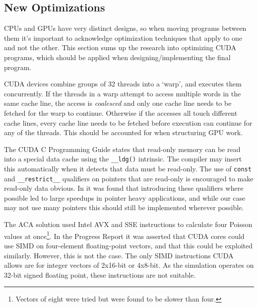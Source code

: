 \subsection{New Optimizations}
\label{sec:FutureOptimization}
CPUs and GPUs have very distinct designs, so when moving programs between them it's important to acknowledge optimization techniques that apply to one and not the other.
This section sums up the research into optimizing CUDA programs, which should be applied when designing/implementing the final program.

CUDA devices combine groups of 32 threads into a `warp', and executes them concurrently\cite{tool:CUDAProgrammingV1}.
If the threads in a warp attempt to access multiple words in the same cache line, the access is \textit{coalesced}\cite{NVIDIAHowBlog} and only one cache line needs to be fetched for the warp to continue.
Otherwise if the accesses all touch different cache lines, every cache line needs to be fetched before execution can continue for any of the threads.
This should be accounted for when structuring GPU work.

The CUDA C Programming Guide\cite{NVIDIAGlobalGuide} states that read-only memory can be read into a special data cache using the \texttt{\_\_ldg()} intrinsic.
The compiler may insert this automatically when it detects that data must be read-only.
The use of \texttt{const} and \texttt{\_\_restrict\_\_} qualifiers on pointers that are read-only is encouraged to make read-only data obvious.
In \cite{10.1145/3238147.3241533} it was found that introducing these qualifiers where possible led to large speedups in pointer heavy applications, and while our case may not use many pointers this should still be implemented wherever possible.

The ACA solution used Intel AVX and SSE instructions\cite{IntelCorporationIntroductionExtensions} to calculate four Poisson values at once\footnote{Vectors of eight were tried but were found to be slower than four.}.
In the Progress Report it was asserted that CUDA cores could use SIMD on four-element floating-point vectors, and that this could be exploited similarly.
However, this is not the case.
The only SIMD instructions CUDA allows are for integer vectors of 2x16-bit or 4x8-bit.
As the simulation operates on 32-bit signed floating point, these instructions are not suitable.

